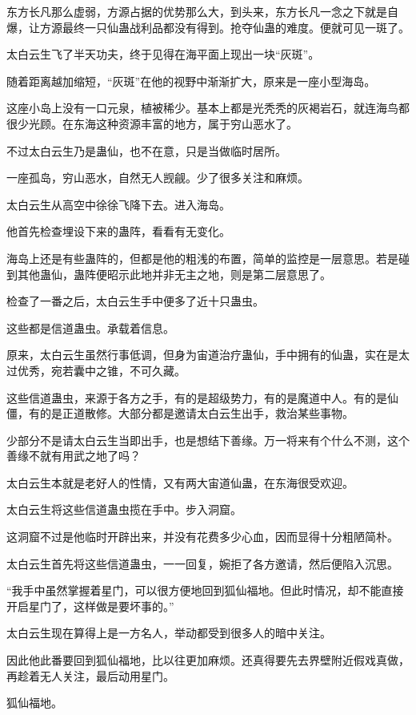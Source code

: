 \begin{this_body}
东方长凡那么虚弱，方源占据的优势那么大，到头来，东方长凡一念之下就是自爆，让方源最终一只仙蛊战利品都没有得到。抢夺仙蛊的难度。便就可见一斑了。

太白云生飞了半天功夫，终于见得在海平面上现出一块“灰斑”。

随着距离越加缩短，“灰斑”在他的视野中渐渐扩大，原来是一座小型海岛。

这座小岛上没有一口元泉，植被稀少。基本上都是光秃秃的灰褐岩石，就连海鸟都很少光顾。在东海这种资源丰富的地方，属于穷山恶水了。

不过太白云生乃是蛊仙，也不在意，只是当做临时居所。

一座孤岛，穷山恶水，自然无人觊觎。少了很多关注和麻烦。

太白云生从高空中徐徐飞降下去。进入海岛。

他首先检查埋设下来的蛊阵，看看有无变化。

海岛上还是有些蛊阵的，但都是他的粗浅的布置，简单的监控是一层意思。若是碰到其他蛊仙，蛊阵便昭示此地并非无主之地，则是第二层意思了。

检查了一番之后，太白云生手中便多了近十只蛊虫。

这些都是信道蛊虫。承载着信息。

原来，太白云生虽然行事低调，但身为宙道治疗蛊仙，手中拥有的仙蛊，实在是太过优秀，宛若囊中之锥，不可久藏。

这些信道蛊虫，来源于各方之手，有的是超级势力，有的是魔道中人。有的是仙僵，有的是正道散修。大部分都是邀请太白云生出手，救治某些事物。

少部分不是请太白云生当即出手，也是想结下善缘。万一将来有个什么不测，这个善缘不就有用武之地了吗？

太白云生本就是老好人的性情，又有两大宙道仙蛊，在东海很受欢迎。

太白云生将这些信道蛊虫揽在手中。步入洞窟。

这洞窟不过是他临时开辟出来，并没有花费多少心血，因而显得十分粗陋简朴。

太白云生首先将这些信道蛊虫，一一回复，婉拒了各方邀请，然后便陷入沉思。

“我手中虽然掌握着星门，可以很方便地回到狐仙福地。但此时情况，却不能直接开启星门了，这样做是要坏事的。”

太白云生现在算得上是一方名人，举动都受到很多人的暗中关注。

因此他此番要回到狐仙福地，比以往更加麻烦。还真得要先去界壁附近假戏真做，再趁着无人关注，最后动用星门。

狐仙福地。


\end{this_body}
